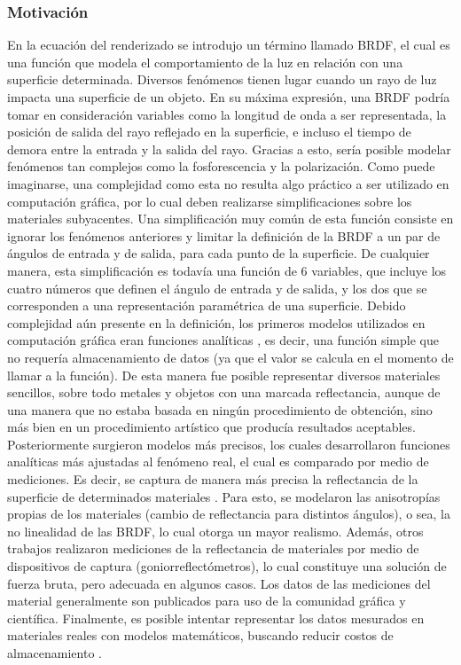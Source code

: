\subsubsection{Motivación}
En la ecuación del renderizado se introdujo un término llamado BRDF, el cual es una función que modela el comportamiento de la luz en relación con una superficie determinada.
Diversos fenómenos tienen lugar cuando un rayo de luz impacta una superficie de un objeto.
En su máxima expresión, una BRDF podría tomar en consideración variables como la longitud de onda a ser representada, la posición de salida del rayo reflejado en la superficie, e incluso el tiempo de demora entre la entrada y la salida del rayo.
Gracias a esto, sería posible modelar fenómenos tan complejos como la fosforescencia y la polarización.
Como puede imaginarse, una complejidad como esta no resulta algo práctico a ser utilizado en computación gráfica, por lo cual deben realizarse simplificaciones sobre los materiales subyacentes.
Una simplificación muy común de esta función consiste en ignorar los fenómenos anteriores y limitar la definición de la BRDF a un par de ángulos de entrada y de salida, para cada punto de la superficie.
De cualquier manera, esta simplificación es todavía una función de $6$ variables, que incluye los cuatro números que definen el ángulo de entrada y de salida, y los dos que se corresponden a una representación paramétrica de una superficie.
Debido complejidad aún presente en la definición, los primeros modelos utilizados en computación gráfica eran funciones analíticas \cite{Phong1975,Blinn1977}, es decir, una función simple que no requería almacenamiento de datos (ya que el valor se calcula en el momento de llamar a la función).
De esta manera fue posible representar diversos materiales sencillos, sobre todo metales y objetos con una marcada reflectancia, aunque de una manera que no estaba basada en ningún procedimiento de obtención, sino más bien en un procedimiento artístico que producía resultados aceptables.
Posteriormente surgieron modelos más precisos, los cuales desarrollaron funciones analíticas más ajustadas al fenómeno real, el cual es comparado por medio de mediciones.
Es decir, se captura de manera más precisa la reflectancia de la superficie de determinados materiales \cite{He1991,Ward1992,Lafortune1997}.
Para esto, se modelaron las anisotropías propias de los materiales (cambio de reflectancia para distintos ángulos), o sea, la no linealidad de las BRDF, lo cual otorga un mayor realismo.
Además, otros trabajos \cite{Dana1999,Matusik2003} realizaron mediciones de la reflectancia de materiales por medio de dispositivos de captura (goniorreflectómetros), lo cual constituye una solución de fuerza bruta, pero adecuada en algunos casos.
Los datos de las mediciones del material generalmente son publicados para uso de la comunidad gráfica y científica.
Finalmente, es posible intentar representar los datos mesurados en materiales reales con modelos matemáticos, buscando reducir costos de almacenamiento \cite{Ngan2005}.

